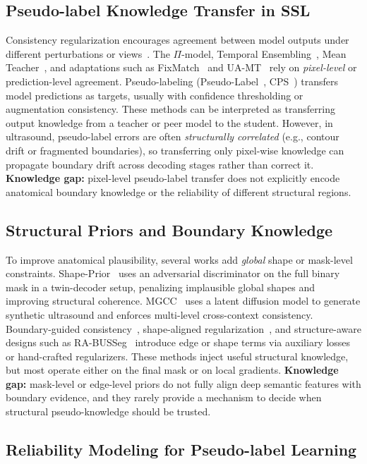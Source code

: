 \documentclass[a4paper,fleqn]{cas-dc}
\begin{document}
\subsection{Pseudo-label Knowledge Transfer in SSL}

Consistency regularization encourages agreement between model outputs under different perturbations or views~\cite{b19,b18,b35}. The $\Pi$-model, Temporal Ensembling~\cite{b19}, Mean Teacher~\cite{b19}, and adaptations such as FixMatch~\cite{b18} and UA-MT~\cite{b21} rely on \emph{pixel-level} or prediction-level agreement. Pseudo-labeling (Pseudo-Label~\cite{b13}, CPS~\cite{b15}) transfers model predictions as targets, usually with confidence thresholding or augmentation consistency. These methods can be interpreted as transferring output knowledge from a teacher or peer model to the student. However, in ultrasound, pseudo-label errors are often \emph{structurally correlated} (e.g., contour drift or fragmented boundaries), so transferring only pixel-wise knowledge can propagate boundary drift across decoding stages rather than correct it. \textbf{Knowledge gap:} pixel-level pseudo-label transfer does not explicitly encode anatomical boundary knowledge or the reliability of different structural regions.

\subsection{Structural Priors and Boundary Knowledge}

To improve anatomical plausibility, several works add \emph{global} shape or mask-level constraints. Shape-Prior~\cite{b2} uses an adversarial discriminator on the full binary mask in a twin-decoder setup, penalizing implausible global shapes and improving structural coherence. MGCC~\cite{b65} uses a latent diffusion model to generate synthetic ultrasound and enforces multi-level cross-context consistency. Boundary-guided consistency~\cite{b60,b61}, shape-aligned regularization~\cite{b62,b63}, and structure-aware designs such as RA-BUSSeg~\cite{b56} introduce edge or shape terms via auxiliary losses or hand-crafted regularizers. These methods inject useful structural knowledge, but most operate either on the final mask or on local gradients. \textbf{Knowledge gap:} mask-level or edge-level priors do not fully align deep semantic features with boundary evidence, and they rarely provide a mechanism to decide when structural pseudo-knowledge should be trusted.

\subsection{Reliability Modeling for Pseudo-label Learning}
\end{document}
